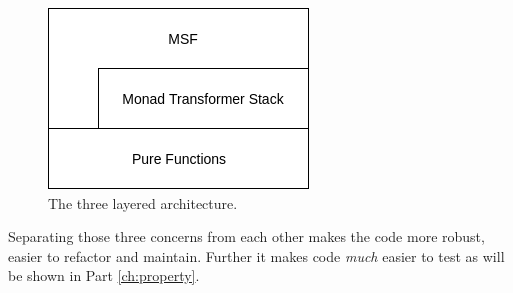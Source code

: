 \begin{figure}
	\centering
	\includegraphics[width=.4\textwidth, angle=0]{./fig/eventdriven/3layers.png}
	\caption{The three layered architecture.}
	\label{fig:3layer_system}
\end{figure}

Separating those three concerns from each other makes the code more robust, easier to refactor and maintain. Further it makes code \textit{much} easier to test as will be shown in Part \ref{ch:property}. 


